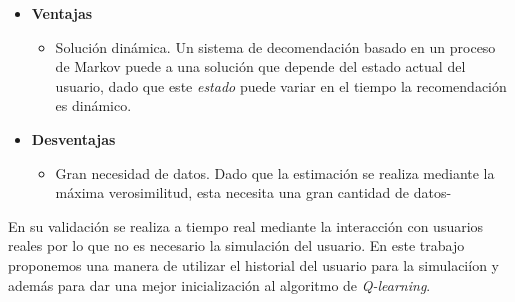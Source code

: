 \begin{itemize}
    \item \textbf{Ventajas} 
    \begin{itemize}
        \item Solución dinámica. Un sistema de decomendación basado en un proceso de Markov puede a una solución que depende del estado actual del usuario, dado que este \emph{estado} puede variar en el tiempo la recomendación es dinámico.
    \end{itemize}
    \item \textbf{Desventajas}
    \begin{itemize}
        \item Gran necesidad de datos. Dado que la estimación se realiza mediante la máxima verosimilitud, esta necesita una gran cantidad de datos-
    \end{itemize}
\end{itemize}


En \cite{shani2005mdp} su validación se realiza a tiempo real mediante la interacción con usuarios reales por lo que no es necesario la simulación del usuario. En este trabajo proponemos una manera de utilizar el historial del usuario para la simulaciíon y además para dar una mejor inicialización al algoritmo de \emph{Q-learning}.